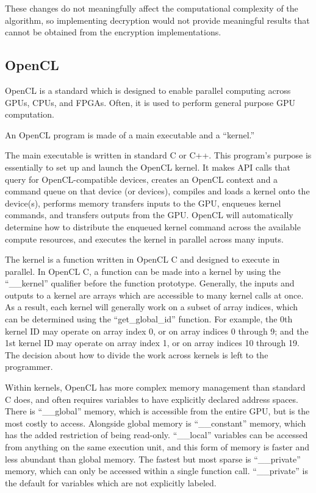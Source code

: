 \documentclass[a4paper,10pt]{article}
\begin{document}
These changes do not meaningfully affect the computational complexity of the algorithm, so implementing decryption would not provide meaningful results that cannot be obtained from the encryption implementations.

\subsection{OpenCL}

OpenCL is a standard\cite{khronos} which is designed to enable parallel computing across GPUs, CPUs, and FPGAs.  Often, it is used to perform general purpose GPU computation.

An OpenCL program is made of a main executable and a ``kernel.''

The main executable is written in standard C or C++. This program's purpose is essentially to set up and launch the OpenCL kernel.  It makes API calls that query for OpenCL-compatible devices, creates an OpenCL context and a command queue on that device (or devices), compiles and loads a kernel onto the device(s), performs memory transfers inputs to the GPU, enqueues kernel commands, and transfers outputs from the GPU.  OpenCL will automatically determine how to distribute the enqueued kernel command across the available compute resources, and executes the kernel in parallel across many inputs.  

The kernel is a function written in OpenCL C and designed to execute in parallel.  In OpenCL C, a function can be made into a kernel by using the ``\_\_kernel'' qualifier before the function prototype.  Generally, the inputs and outputs to a kernel are arrays which are accessible to many kernel calls at once.  As a result, each kernel will generally work on a subset of array indices, which can be determined using the ``get\_global\_id'' function. For example, the 0th kernel ID may operate on array index 0, or on array indices 0 through 9; and the 1st kernel ID may operate on array index 1, or on array indices 10 through 19.  The decision about how to divide the work across kernels is left to the programmer.

Within kernels, OpenCL has more complex memory management than standard C does, and often requires variables to have explicitly declared address spaces.  There is ``\_\_global'' memory, which is accessible from the entire GPU, but is the most costly to access.  Alongside global memory is ``\_\_constant'' memory, which has the added restriction of being read-only.  ``\_\_local'' variables can be accessed from anything on the same execution unit, and this form of memory is faster and less abundant than global memory. The fastest but most sparse is ``\_\_private'' memory, which can only be accessed within a single function call.  ``\_\_private'' is the default for variables which are not explicitly labeled.
\end{document}
